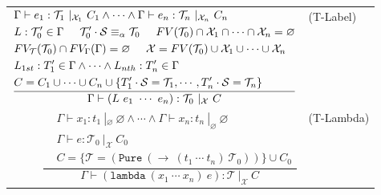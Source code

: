 \documentclass{article}
\begin{document}
\begin{figure}[tb]
\begin{tabular}{rlrl}
        \multicolumn{3}{r}{
        $\dfrac{
            \begin{aligned}
                &\Gamma \vdash e_1 : \mathcal{T}_1\ |_{\mathcal{X}_1}\ C_1 \land \cdots \land
                    \Gamma \vdash e_n : \mathcal{T}_n\ |_{\mathcal{X}_n}\ C_n \\
                &L : \mathcal{T}_0' \in \Gamma \hspace{5mm} \mathcal{T}_0' \cdot \mathcal{S}\equiv_\alpha \mathcal{T}_0 \hspace{5mm} FV(\mathcal{T}_0) \cap \mathcal{X}_1 \cap \cdots \cap \mathcal{X}_n = \varnothing \\
                &FV_\mathcal{T}(\mathcal{T}_0) \cap FV_\Gamma(\Gamma) = \varnothing \hspace{5mm}
                    \mathcal{X} = FV(\mathcal{T}_0) \cup \mathcal{X}_1 \cup \cdots \cup \mathcal{X}_n \\
                &L_{1st} : T_1' \in \Gamma \land \cdots \land L_{nth} : T_n' \in \Gamma \\
                &C = C_1 \cup \cdots \cup C_n \cup \{T_1' \cdot \mathcal{S} = \mathcal{T}_1, \cdots, T_n' \cdot \mathcal{S} = \mathcal{T}_n\} \\
            \end{aligned}
        }{
            \Gamma \vdash (L\ e_1\ \cdots\ e_n) : \mathcal{T}_0\ |_{\mathcal{X}}\ C
        }$} & (T-Label) \vspace{5mm} \\

        \multicolumn{3}{r}{
            $\dfrac{
                \begin{aligned}
                    &\Gamma \vdash x_1 : t_1\ |_\varnothing\ \varnothing \land \cdots \land \Gamma \vdash x_n : t_n\ |_\varnothing\ \varnothing \\
                    &\Gamma \vdash e : \mathcal{T}_0\ |_{\mathcal{X}}\ C_0 \\
                    &C = \{\mathcal{T} = (\mathtt{Pure}\ (\rightarrow\ (t_1\ \cdots\ t_n)\ \mathcal{T}_0))\} \cup C_0
                \end{aligned}
            }
            {
                \Gamma \vdash (\mathtt{lambda}\ (x_1\ \cdots\ x_n)\ e) : \mathcal{T}\ |_\mathcal{X}\ C
            }$
        } & (T-Lambda) \vspace{5mm} \\


\end{tabular}
\end{figure}
\end{document}
